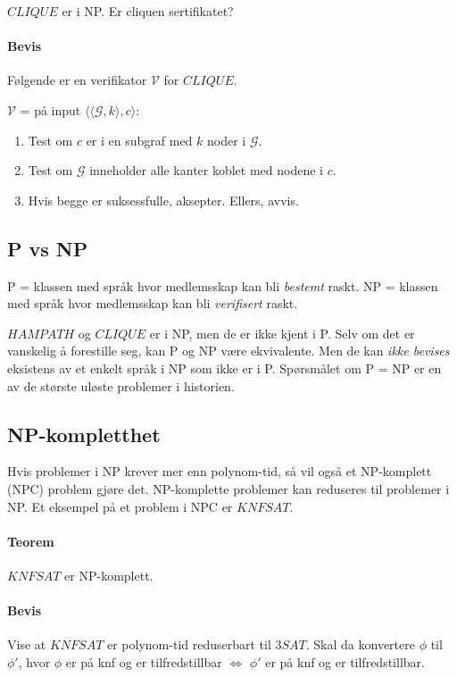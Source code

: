 \documentclass[11pt,a4paper]{article}
\begin{document}
$CLIQUE$ er i NP. Er cliquen sertifikatet?

\paragraph{Bevis} Følgende er en verifikator $\mathcal{V}$ for $CLIQUE$.

$\mathcal{V}$ = på input $\langle \langle \mathcal{G},k \rangle,c\rangle$:
\begin{enumerate}
\item{Test om $c$ er i en subgraf med $k$ noder i $\mathcal{G}$.}
\item{Test om $\mathcal{G}$ inneholder alle kanter koblet med nodene i $c$.}
\item{Hvis begge er suksessfulle, aksepter. Ellers, avvis.}
\end{enumerate}

\subsection{P vs NP}
P = klassen med språk hvor medlemsskap kan bli \textit{bestemt} raskt. NP = klassen med språk hvor medlemsskap kan bli \textit{verifisert} raskt.

$HAMPATH$ og $CLIQUE$ er i NP, men de er ikke kjent i P. Selv om det er vanskelig å forestille seg, kan P og NP være ekvivalente. Men de kan \textit{ikke bevises} eksistens av et enkelt språk i NP som ikke er i P. Spørsmålet om P = NP er en av de største uløste problemer i historien.

\subsection{NP-kompletthet}
Hvis problemer i NP krever mer enn polynom-tid, så vil også et NP-komplett (NPC) problem gjøre det. NP-komplette problemer kan reduseres til problemer i NP. Et eksempel på et problem i NPC er $KNFSAT$.

\paragraph{Teorem} $KNFSAT$ er NP-komplett.
\paragraph{Bevis} Vise at $KNFSAT$ er polynom-tid reduserbart til $3SAT$. Skal da konvertere $\phi$ til $\phi'$, hvor $\phi$ er på knf og er tilfredstillbar $\Leftrightarrow$ $\phi'$ er på knf og er tilfredstillbar.
\end{document}
